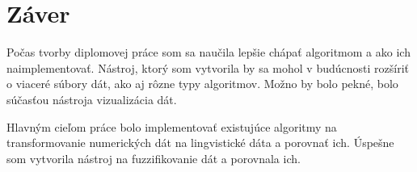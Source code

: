 \chapter*{Záver}

  

Počas tvorby diplomovej práce som sa naučila lepšie chápať algoritmom a ako ich naimplementovať. Nástroj, ktorý som vytvorila by sa mohol v budúcnosti rozšíriť o viaceré súbory dát, ako aj rôzne typy algoritmov. Možno by bolo pekné, bolo súčasťou nástroja vizualizácia dát. 

Hlavným cieľom práce bolo implementovať existujúce algoritmy na transformovanie numerických dát na lingvistické dáta a porovnať ich.
Úspešne som vytvorila nástroj na fuzzifikovanie dát a porovnala ich. 














